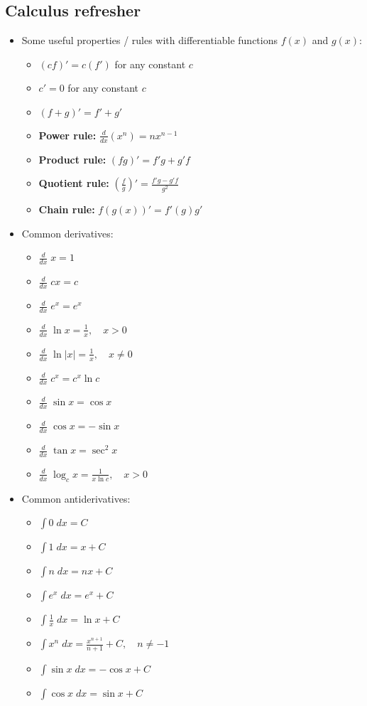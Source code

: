 \documentclass{article}
\begin{document}
\begin{multicols*}{2}
\subsection{Calculus refresher}
\begin{itemize}
    \item Some useful properties / rules with differentiable functions $f(x)$ and $g(x)$:
    \begin{itemize}
        \item $(cf)' = c(f')$ for any constant $c$
        \item $c' = 0$ for any constant $c$
        \item $(f+g)' = f' + g'$
        \item \textbf{Power rule:} $\frac{d}{dx}(x^n) = nx^{n-1}$
        \item \textbf{Product rule:} $(fg)' = f'g + g'f$
        \item \textbf{Quotient rule:} $(\frac{f}{g})' = \frac{f'g - g'f}{g^2}$
        \item \textbf{Chain rule:} $f(g(x))' = f'(g)g'$
    \end{itemize}
    \item Common derivatives:
    \begin{itemize}
        \item $\frac{d}{dx}\; x = 1$
        \item $\frac{d}{dx}\; cx = c$
        \item $\frac{d}{dx}\; e^x = e^x$
        \item $\frac{d}{dx}\; \ln{x} = \frac{1}{x}, \quad x > 0$
        \item $\frac{d}{dx}\; \ln{\lvert x \rvert}= \frac{1}{x}, \quad x \neq 0$
        \item $\frac{d}{dx}\; c^x = c^x \ln{c}$
        \item $\frac{d}{dx}\; \sin{x} = \cos{x}$
        \item $\frac{d}{dx}\; \cos{x} = -\sin{x}$
        \item $\frac{d}{dx}\; \tan{x} = \sec^2{x}$
        \item $\frac{d}{dx}\; \log_c{x}=\frac{1}{x\ln{c}}, \quad x > 0 $
    \end{itemize}
    \item Common antiderivatives:
    \begin{itemize}
        \item $\int 0 \;dx = C$
        \item $\int 1 \;dx = x + C$
        \item $\int n \;dx = nx + C$
        \item $\int e^x \;dx = e^x + C$
        \item $\int \frac{1}{x} \;dx = \ln{x} +C$
        \item $\int x^n \;dx = \frac{x^{n+1}}{n+1} + C, \quad n \neq -1$
        \item $\int \sin{x} \; dx = -\cos{x} + C$
        \item $\int \cos{x} \; dx = \sin{x} + C$
    \end{itemize}
\end{itemize}


\end{multicols*}
\end{document}
